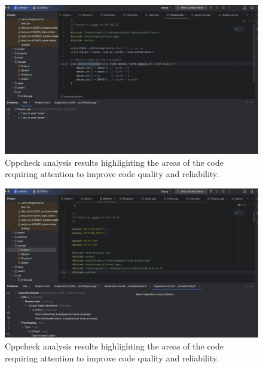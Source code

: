 \documentclass[12pt]{article}
\begin{document}
\begin{figure}[h!]
    \centering
    \includegraphics[width=\linewidth]{cpp1.png}
    \caption{Cppcheck analysis results highlighting the areas of the code requiring attention to improve code quality and reliability.}
    \label{fig:cppcheck_results}
\end{figure}
\FloatBarrier

\begin{figure}[h!]
    \centering
    \includegraphics[width=\linewidth]{cpp2.png}
    \caption{Cppcheck analysis results highlighting the areas of the code requiring attention to improve code quality and reliability.}
    \label{fig:cppcheck_results}
\end{figure}
\FloatBarrier
\end{document}
